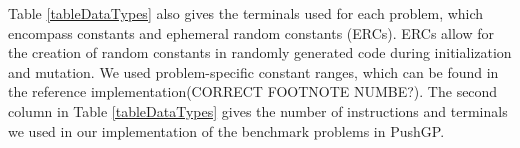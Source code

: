 \documentclass{sig-alternate}
\begin{document}
Table \ref{tableDataTypes} also gives the terminals used for each problem, which encompass constants and ephemeral random constants (ERCs). ERCs allow for the creation of random constants in randomly generated code during initialization and mutation. We used problem-specific constant ranges, which can be found in the reference implementation\footnotemark[2] (CORRECT FOOTNOTE NUMBE?).
The second column in Table \ref{tableDataTypes} gives the number of instructions and terminals we used in our implementation of the benchmark problems in PushGP. 
\end{document}
